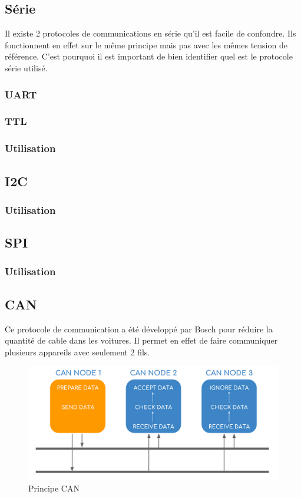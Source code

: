 \documentclass[a4paper, 11pt]{report}
\begin{document}
\subsection{Série}
Il existe 2 protocoles de communications en série qu'il est facile de confondre. Ils fonctionnent en effet sur le même principe mais pas avec les mêmes tension de référence. C'est pourquoi il est important de bien identifier quel est le protocole série utilisé.

\subsubsection{UART}

\subsubsection{TTL}

\subsubsection{Utilisation}

\subsection{I2C}

\subsubsection{Utilisation}

\subsection{SPI}

\subsubsection{Utilisation}

\subsection{CAN}
Ce protocole de communication a été développé par Bosch pour réduire la quantité de cable dans les voitures. Il permet en effet de faire communiquer plusieurs appareils avec seulement 2 fils.

\begin{figure}[h!]
	\begin{center}
		\includegraphics[scale=0.6]{images/principeCAN.png}
		\caption{Principe CAN}
	\end{center}
\end{figure}
\end{document}
